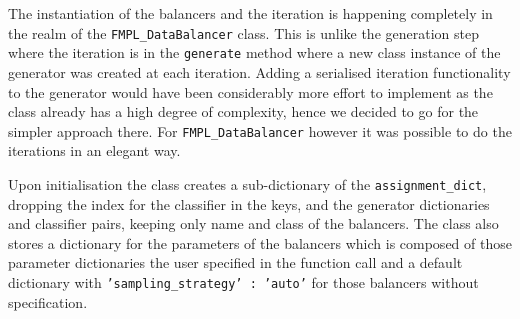 The instantiation of the balancers and the iteration is happening completely in the realm of the \texttt{FMPL\_DataBalancer} class. 
This is unlike the generation step where the iteration is in the \texttt{generate} method where a new class instance of the generator was created at each iteration.
Adding a serialised iteration functionality to the generator would have been considerably more effort to implement as the class already has a high degree of complexity,
hence we decided to go for the simpler approach there. For \texttt{FMPL\_DataBalancer} however it was possible to do the iterations in an elegant way.

Upon initialisation the class creates a sub-dictionary of the \texttt{assignment\_dict}, dropping the index for the classifier in the keys,
and the generator dictionaries and classifier pairs, keeping only name and class of the balancers.
The class also stores a dictionary for the parameters of the balancers which is composed of those parameter dictionaries the user specified in the function call
and a default dictionary with \texttt{'sampling\_strategy' : 'auto'} for those balancers without specification.

